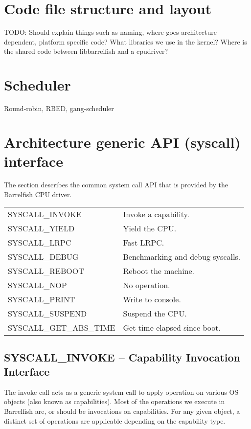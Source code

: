 \documentclass[a4paper,11pt,twoside]{report}
\begin{document}
{{\section{Code file structure and layout}
TODO: Should explain things such as naming, where goes architecture dependent, platform specific code?
What libraries we use in the kernel? Where is the shared code between libbarrelfish and a cpudriver?

\section{Scheduler}
Round-robin, RBED, gang-scheduler

\section{Architecture generic API (syscall) interface}

The section describes the common system call API that is provided by the
Barrelfish CPU driver.

\begin{tabular}{|p{5cm}|>{\raggedright\arraybackslash}p{7cm}|}
\hline

SYSCALL\_INVOKE & Invoke a capability. \\
SYSCALL\_YIELD & Yield the CPU. \\
SYSCALL\_LRPC & Fast LRPC. \\
SYSCALL\_DEBUG & Benchmarking and debug syscalls. \\
SYSCALL\_REBOOT & Reboot the machine. \\
SYSCALL\_NOP & No operation. \\
SYSCALL\_PRINT & Write to console. \\
SYSCALL\_SUSPEND & Suspend the CPU. \\
SYSCALL\_GET\_ABS\_TIME & Get time elapsed since boot. \\

\hline
\end{tabular}

\subsection{SYSCALL\_INVOKE -- Capability Invocation Interface}

The invoke call acts as a generic system call to apply operation on various
OS objects (also known as capabilities). Most of the operations we execute in
Barrelfish are, or should be invocations on capabilities. For any given
object, a distinct set of operations are applicable depending on the
capability type.

}}
\end{document}
